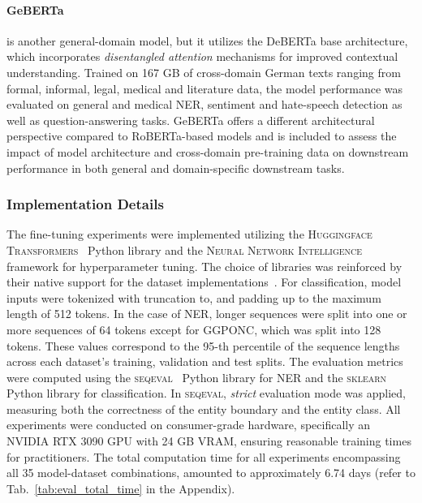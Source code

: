 \paragraph{GeBERTa} is another general-domain model, but it utilizes the DeBERTa
\cite{he2021deberta} base architecture, which incorporates \textit{disentangled
attention} mechanisms for improved contextual understanding. Trained on 167 GB
of cross-domain German texts ranging from formal, informal, legal, medical and
literature data, the model performance was evaluated on general and medical NER,
sentiment and hate-speech detection as well as question-answering tasks. GeBERTa
offers a different architectural perspective compared to RoBERTa-based models
and is included to assess the impact of model architecture and cross-domain
pre-training data on downstream performance in both general and domain-specific
downstream tasks.

\subsubsection{Implementation Details}

The fine-tuning experiments were implemented utilizing the \textsc{Huggingface
Transformers}~\cite{wolf2020transformers} Python library and the \textsc{Neural
Network Intelligence}~\cite{nni} framework for hyperparameter tuning. The choice
of libraries was reinforced by their native support for the dataset
implementations~\cite{fries2022bigbio,lhoest2021datasets}. For classification,
model inputs were tokenized with truncation to, and padding up to the maximum
length of 512 tokens. In the case of NER, longer sequences were split into one
or more sequences of 64 tokens except for GGPONC, which was split into 128
tokens. These values correspond to the 95-th percentile of the sequence lengths
across each dataset's training, validation and test splits. The evaluation
metrics were computed using the \textsc{seqeval}~\cite{seqeval} Python library
for NER and the \textsc{sklearn}~\cite{pedregosa2011scikit} Python library for
classification. In \textsc{seqeval}, \textit{strict} evaluation mode was
applied, measuring both the correctness of the entity boundary and the entity
class. All experiments were conducted on consumer-grade hardware, specifically
an NVIDIA RTX 3090 GPU with 24 GB VRAM, ensuring reasonable training times for
practitioners. The total computation time for all experiments encompassing all
35 model-dataset combinations, amounted to approximately 6.74 days (refer to
Tab.~\ref{tab:eval_total_time} in the Appendix).
